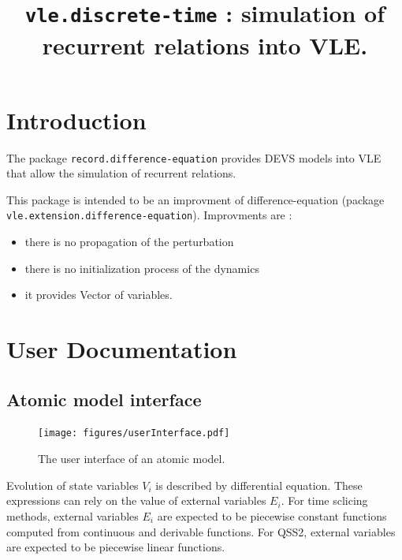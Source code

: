 \documentclass{article}
\title{{\tt vle.discrete-time} : simulation of 
recurrent relations into VLE.}
\theoremstyle{remark}
\begin{document}
\maketitle

\tableofcontents

\section{Introduction}

The package {\tt record.difference-equation} provides DEVS models
into VLE that allow the simulation of recurrent relations.

This package is intended to be an improvment of difference-equation 
(package {\tt vle.extension.difference-equation}). Improvments are :
\begin{itemize}
  \item there is no propagation of the perturbation
  \item there is no initialization process of the dynamics
  \item it provides Vector of variables.
\end{itemize}

\section{User Documentation}

\subsection{Atomic model interface}
\label{sec:user:atomic}

\begin{figure}[!h]
\begin{center} 
\texttt{[image: figures/userInterface.pdf]}
\caption{\label{fig:userInt} The user interface of an atomic model.}
\end{center}
\end{figure}

Evolution of state variables $V_i$ is described by differential equation. 
These expressions can rely on the value of external variables $E_i$.
For time sclicing methods, external variables $E_i$  are expected to be
piecewise constant functions computed from continuous and derivable functions. 
For QSS2, external variables are expected to be
piecewise linear functions.
\end{document}
